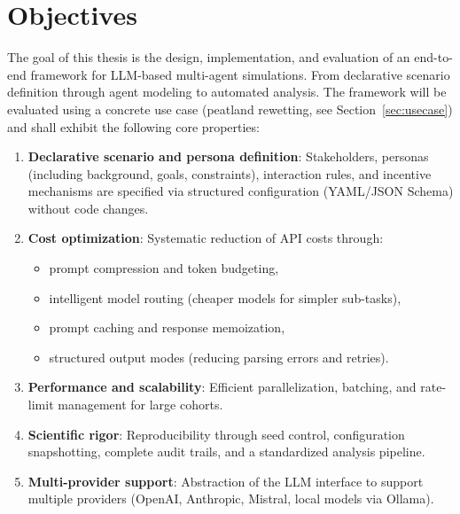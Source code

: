 \documentclass[12pt, a4paper]{article}
\begin{document}
\section{Objectives}

The goal of this thesis is the design, implementation, and evaluation of an end-to-end framework for LLM-based multi-agent simulations. From declarative scenario definition through agent modeling to automated analysis. The framework will be evaluated using a concrete use case (peatland rewetting, see Section~\ref{sec:usecase}) and shall exhibit the following core properties:

\begin{enumerate}
    \item \textbf{Declarative scenario and persona definition}: Stakeholders, personas (including background, goals, constraints), interaction rules, and incentive mechanisms are specified via structured configuration (YAML/JSON Schema) without code changes.

    \item \textbf{Cost optimization}: Systematic reduction of API costs through:
    \begin{itemize}
        \item prompt compression and token budgeting,
        \item intelligent model routing (cheaper models for simpler sub-tasks),
        \item prompt caching and response memoization,
        \item structured output modes (reducing parsing errors and retries).
    \end{itemize}

    \item \textbf{Performance and scalability}: Efficient parallelization, batching, and rate-limit management for large cohorts.

    \item \textbf{Scientific rigor}: Reproducibility through seed control, configuration snapshotting, complete audit trails, and a standardized analysis pipeline.

    \item \textbf{Multi-provider support}: Abstraction of the LLM interface to support multiple providers (OpenAI, Anthropic, Mistral, local models via Ollama).
\end{enumerate}
\end{document}
